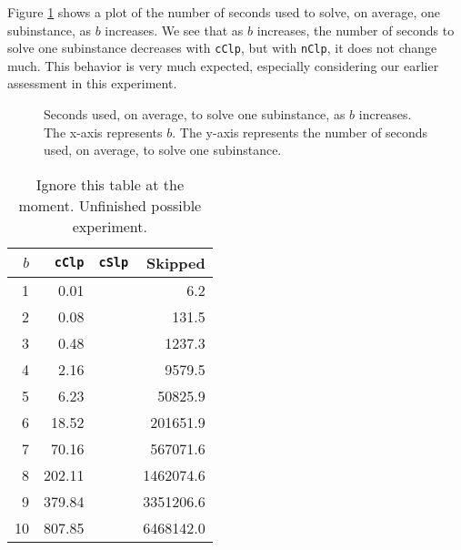 Figure \ref{fig:constructincb} shows a plot of the number of seconds used to
solve, on average, one subinstance, as $b$ increases.
We see that as $b$ increases, the number of
seconds to solve one subinstance decreases with \texttt{cClp},
but with \texttt{nClp}, it does not change much. This behavior is very
much expected, especially considering our earlier assessment in this
experiment.

\begin{figure}[ht!]
    \centering
    
    \caption{Seconds used, on average, to solve one subinstance, as $b$
             increases.
             The x-axis represents $b$.
             The y-axis represents the number of seconds used, on average,
             to solve one subinstance.}
    \label{fig:constructincb}
\end{figure}

\begin{table}[ht!]
\centering
\caption{Ignore this table at the moment. Unfinished possible experiment.}
\begin{tabular}{rrrr}
    $b$ & \texttt{cClp} & \texttt{cSlp} & Skipped \\ \hline
     1  & 0.01          &               & 6.2 \\
     2  & 0.08          &               & 131.5 \\
     3  & 0.48          &               & 1237.3 \\
     4  & 2.16          &               & 9579.5 \\
     5  & 6.23          &               & 50825.9 \\
     6  & 18.52         &               & 201651.9 \\
     7  & 70.16         &               & 567071.6 \\
     8  & 202.11        &               & 1462074.6 \\
     9  & 379.84        &               & 3351206.6 \\
     10 & 807.85        &               & 6468142.0
\end{tabular}
\end{table}
